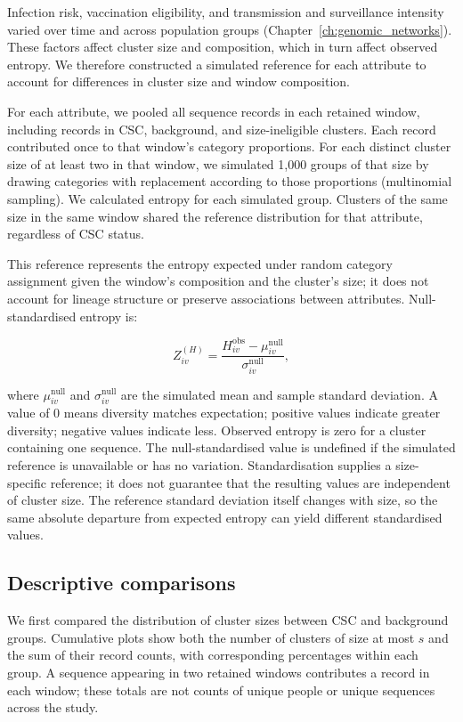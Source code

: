 Infection risk, vaccination eligibility, and transmission and surveillance intensity varied over time and across population groups (Chapter~\ref{ch:genomic_networks}). These factors affect cluster size and composition, which in turn affect observed entropy. We therefore constructed a simulated reference for each attribute to account for differences in cluster size and window composition.

For each attribute, we pooled all sequence records in each retained window, including records in CSC, background, and size-ineligible clusters. Each record contributed once to that window's category proportions. For each distinct cluster size of at least two in that window, we simulated 1,000 groups of that size by drawing categories with replacement according to those proportions (multinomial sampling). We calculated entropy for each simulated group. Clusters of the same size in the same window shared the reference distribution for that attribute, regardless of CSC status.

This reference represents the entropy expected under random category assignment given the window's composition and the cluster's size; it does not account for lineage structure or preserve associations between attributes. Null-standardised entropy is:

\[
    Z_{iv}^{(H)} = \frac{H_{iv}^{\mathrm{obs}} - \mu_{iv}^{\mathrm{null}}}{\sigma_{iv}^{\mathrm{null}}},
\]

where $\mu_{iv}^{\mathrm{null}}$ and $\sigma_{iv}^{\mathrm{null}}$ are the simulated mean and sample standard deviation. A value of 0 means diversity matches expectation; positive values indicate greater diversity; negative values indicate less. Observed entropy is zero for a cluster containing one sequence. The null-standardised value is undefined if the simulated reference is unavailable or has no variation. Standardisation supplies a size-specific reference; it does not guarantee that the resulting values are independent of cluster size. The reference standard deviation itself changes with size, so the same absolute departure from expected entropy can yield different standardised values.

\subsection{Descriptive comparisons}\label{sec:ch6_descriptive_methods}

We first compared the distribution of cluster sizes between CSC and background groups. Cumulative plots show both the number of clusters of size at most $s$ and the sum of their record counts, with corresponding percentages within each group. A sequence appearing in two retained windows contributes a record in each window; these totals are not counts of unique people or unique sequences across the study.

